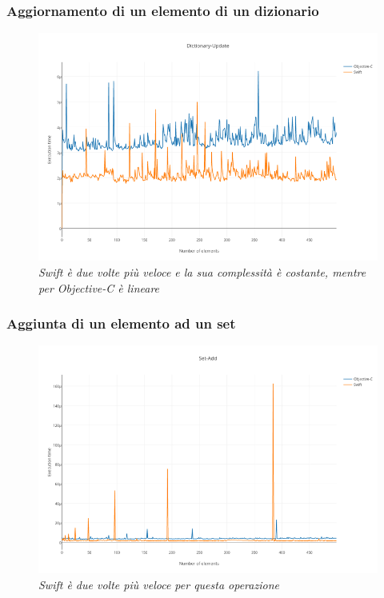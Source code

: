 \subsubsection{Aggiornamento di un elemento di un dizionario}
\begin{figure}[H]
      \centering
      \includegraphics[scale=0.50]{immagini/dictionary_update.png}
            \vspace{0.8cm}
            \caption{\textit{Swift è due volte più veloce e la sua complessità è costante, mentre per Objective-C è lineare}}
\end{figure}
\subsubsection{Aggiunta di un elemento ad un set}
    \begin{figure}[H]
      \centering
      \includegraphics[scale=0.50]{immagini/set_add.png}
            \vspace{0.8cm}
            \caption{\textit{Swift è due volte più veloce per questa operazione}}
\end{figure}
